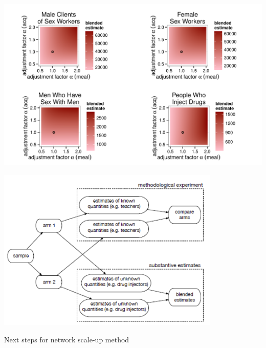 \documentclass[aspectratio=169]{beamer}
\begin{document}
\begin{frame}

\begin{center}
\includegraphics[width=\textwidth]{figures/feehan_quality_fig6}
\end{center}

\end{frame}
\begin{frame}

\begin{center}
\includegraphics[width=0.8\textwidth]{figures/feehan_quality_2015_fig7}
\end{center}

\end{frame}
\begin{frame}

\LARGE{Next steps for network scale-up method}

\end{frame}
\end{document}
